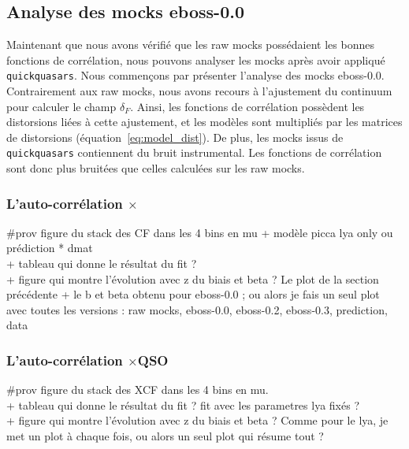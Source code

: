 \documentclass[11pt, twoside, a4paper, openright]{report}
\begin{document}
\subsection{Analyse des mocks eboss-0.0}
Maintenant que nous avons vérifié que les raw mocks possédaient les bonnes fonctions de corrélation, nous pouvons analyser les mocks après avoir appliqué \texttt{quickquasars}.
Nous commençons par présenter l'analyse des mocks eboss-0.0.
Contrairement aux raw mocks, nous avons recours à l'ajustement du continuum pour calculer le champ $\delta_F$. Ainsi, les fonctions de corrélation possèdent les distorsions liées à cette ajustement, et les modèles sont multipliés par les matrices de distorsions (équation~\ref{eq:model_dist}). De plus, les mocks issus de \texttt{quickquasars} contiennent du bruit instrumental. Les fonctions de corrélation sont donc plus bruitées que celles calculées sur les raw mocks.


\subsubsection{L'auto-corrélation \lya{}$\times$\lya{}}
\#prov figure du stack des CF dans les 4 bins en mu + modèle picca lya only ou prédiction * dmat \\
+ tableau qui donne le résultat du fit ? \\
+ figure qui montre l'évolution avec z du biais et beta ? Le plot de la section précédente + le b et beta obtenu pour eboss-0.0 ; ou alors je fais un seul plot avec toutes les versions : raw mocks, eboss-0.0, eboss-0.2, eboss-0.3, prediction, data


\subsubsection{L'auto-corrélation \lya{}$\times$QSO}
\#prov figure du stack des XCF dans les 4 bins en mu. \\
+ tableau qui donne le résultat du fit ? fit avec les parametres lya fixés ?\\ 
+ figure qui montre l'évolution avec z du biais et beta ? Comme pour le lya, je met un plot à chaque fois, ou alors un seul plot qui résume tout ?
\end{document}

